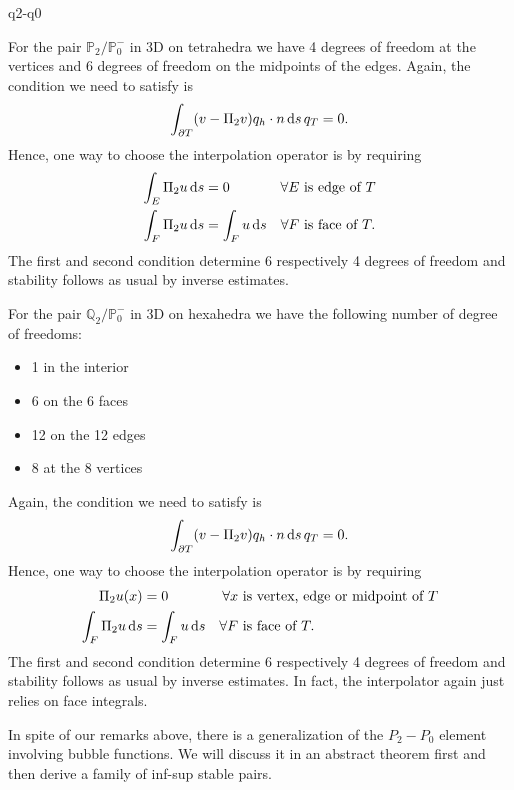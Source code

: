 \begin{Problem}{q2-q0}
\begin{solution}
  For the pair $\mathbb{P}_2/\mathbb{P}_0^-$ in 3D on tetrahedra we have
  4 degrees of freedom at the vertices and 6 degrees of freedom on the midpoints of the edges.
  Again, the condition we need to satisfy is
  \begin{align*}
    \int_{\partial T} (v-\Pi_2v)q_h \cdot n \,\mathrm{d} s \,q_T = 0.
  \end{align*}
  Hence, one way to choose the interpolation operator is by requiring
  \begin{align*}
    \int_E \Pi_2 u\,\mathrm{d} s &= 0           & \forall E &\text{ is edge of } T\\
    \int_F \Pi_2 u\,\mathrm{d} s &= \int_F u\,\mathrm{d} s & \forall F &\text{ is face of } T.
  \end{align*}
  The first and second condition determine 6 respectively 4 degrees of freedom
  and stability follows as usual by inverse estimates.

  For the pair $\mathbb{Q}_2/\mathbb{P}_0^-$ in 3D on hexahedra we have the
  following number of degree of freedoms:
  \begin{itemize}
  \item 1 in the interior
  \item 6 on the 6 faces
  \item 12 on the 12 edges
  \item 8 at the 8 vertices
  \end{itemize}
  Again, the condition we need to satisfy is
  \begin{align*}
    \int_{\partial T} (v-\Pi_2v)q_h \cdot n \,\mathrm{d} s \,q_T = 0.
  \end{align*}
  Hence, one way to choose the interpolation operator is by requiring
  \begin{align*}
    \Pi_2 u(x)        &= 0           & \forall x &\text{ is vertex, edge or midpoint of } T\\
    \int_F \Pi_2 u\,\mathrm{d} s &= \int_F u\,\mathrm{d} s & \forall F &\text{ is face of } T.
  \end{align*}
  The first and second condition determine 6 respectively 4 degrees of freedom
  and stability follows as usual by inverse estimates. In fact, the interpolator again
  just relies on face integrals.
\end{solution}
\end{Problem}

\begin{intro}
  In spite of our remarks above, there is a generalization of the
  $P_2-P_0$ element involving bubble functions. We will discuss it in
  an abstract theorem first and then derive a family of inf-sup stable
  pairs.
\end{intro}

